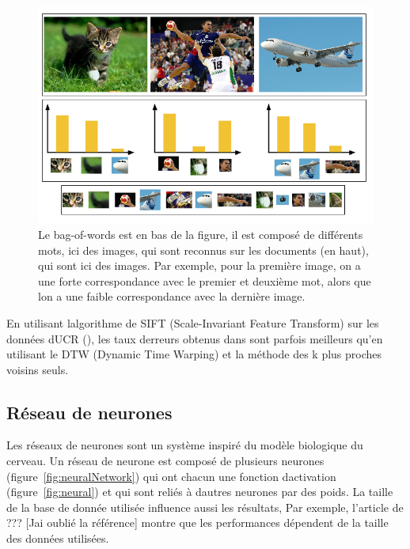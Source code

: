 \documentclass[11pt]{sdm}
\begin{document}
			\begin{figure}[!ht]
				\centering
				\includegraphics[scale=0.6,natwidth=680,natheight=440]{figures/bagOfWords.png}
				\caption{Le bag-of-words est en bas de la figure, il est compos\'e de diff\'erents mots, ici des images, qui sont reconnus sur les documents (en haut), qui sont ici des images. Par exemple, pour la premi\`ere image, on a une forte correspondance avec le premier et deuxi\`eme mot, alors que l\textquotesingle on a une faible correspondance avec la derni\`ere image.}
				\label{fig:BoW}
			\end{figure}

			En utilisant l\textquotesingle algorithme de SIFT (Scale-Invariant Feature Transform) sur les donn\'ees d\textquotesingle UCR (\cite{UCRArchive}), les taux d\textquotesingle erreurs obtenus dans \cite{bailly2015bag} sont parfois meilleurs qu'en utilisant le DTW (Dynamic Time Warping) et la m\'ethode des k plus proches voisins seuls.

	\subsection{R\'eseau de neurones}
	\label{seq:neuralNetwork}
		Les r\'eseaux de neurones sont un syst\`eme inspir\'e du mod\`ele biologique du cerveau. Un r\'eseau de neurone est compos\'e de plusieurs neurones (figure~\ref{fig:neuralNetwork}) qui ont chacun une fonction d\textquotesingle activation (figure~\ref{fig:neural}) et qui sont reli\'es \`a d\textquotesingle autres neurones par des poids.
		La taille de la base de donn\'ee utilis\'ee influence aussi les r\'esultats, Par exemple, l'article de ??? [J\textquotesingle ai oubli\'e la r\'ef\'erence] montre que les performances d\'ependent de la taille des donn\'ees utilis\'ees.
\end{document}
